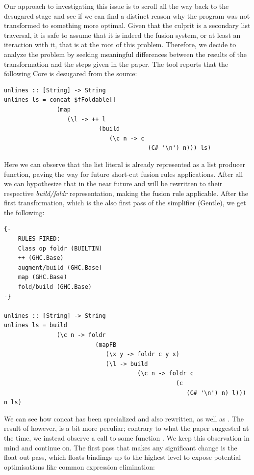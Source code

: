 Our approach to investigating this issue is to scroll all the way back to the desugared stage and see if we can find a distinct reason why the program was not transformed 
to something more optimal. Given that the culprit is a secondary list traversal, it is safe to assume that it is indeed the fusion system, or at least an iteraction with it,
that is at the root of this problem. Therefore, we decide to analyze the problem by seeking meaningful differences between the results of the transformation and the steps
given in the paper. The tool reports that the following Core is desugared from the source:

\begin{listing}[H]
\begin{verbatim}
unlines :: [String] -> String
unlines ls = concat $fFoldable[]
               (map
                  (\l -> ++ l
                           (build
                              (\c n -> c
                                         (C# '\n') n))) ls)
\end{verbatim}
\end{listing}

Here we can observe that the list literal \mono{['\n']} is already represented as a list producer function, paving the way for future short-cut fusion
rules applications. After all we can hypothesize that in the near future  and \mono{++} will be rewritten to their respective \textit{build/foldr} representation,
making the fusion rule applicable. After the first transformation, which is the also first pass of the simplifier (Gentle), we get the following:

\begin{listing}[H]
\begin{verbatim}
{-
    RULES FIRED:
    Class op foldr (BUILTIN)
    ++ (GHC.Base)
    augment/build (GHC.Base)
    map (GHC.Base)
    fold/build (GHC.Base)
-}

unlines :: [String] -> String
unlines ls = build
               (\c n -> foldr
                          (mapFB
                             (\x y -> foldr c y x)
                             (\l -> build
                                      (\c n -> foldr c
                                                 (c
                                                    (C# '\n') n) l))) n ls)
\end{verbatim}
\end{listing}

We can see how concat has been specialized and also rewritten, as well as \mono{++}. The result of  however, is a bit more peculiar; contrary to what the paper
suggested at the time, we instead observe a call to some function . We keep this observation in mind and continue on.
The first pass that makes any significant change is the float out pass, which floats bindings up to the highest level to expose potential optimisations like
common expression elimination:

